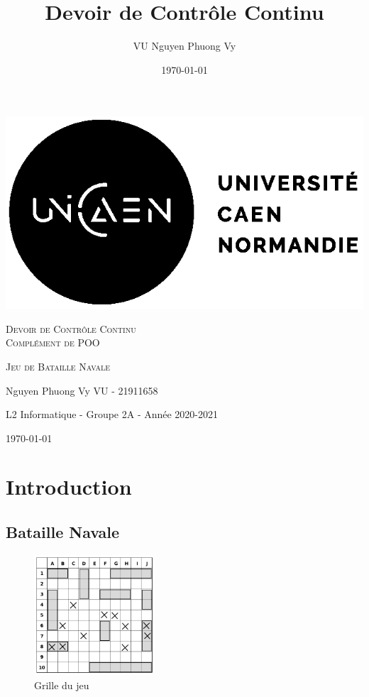 \documentclass[12pt, pdflatex]{article}
\title{Devoir de Contrôle Continu}
\author{VU Nguyen Phuong Vy}
\date{\today}
\begin{document}
\begin{titlepage}
    \centering
    \includegraphics{sources/logo-unicaen.png}\par\vspace{1cm}
    {\scshape\LARGE Devoir de Contrôle Continu\\Complément de POO \par}
    \vspace{1cm}
    {\scshape\LARGE Jeu de Bataille Navale\par}
    \vspace{1cm}
	{\large Nguyen Phuong Vy VU - 21911658\par}
    \vspace{11cm}
    {\large L2 Informatique - Groupe 2A - Année 2020-2021\par}
	{\large \today \par}

\end{titlepage}

\pagebreak

\tableofcontents

\pagebreak
\section{Introduction}
    \subsection{Bataille Navale}

    \begin{figure}
        \centering
        \includegraphics[width=0.4\textwidth, trim=0pt 0pt 0pt 30pt]{sources/grid.png}
        \caption{Grille du jeu}
        \vspace{-20pt}
    \end{figure}
\end{document}
